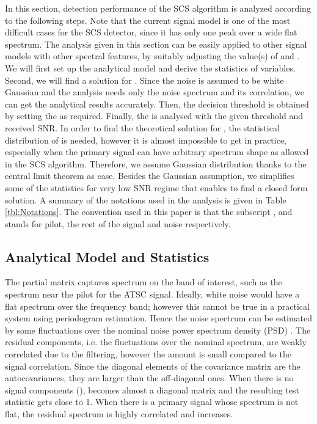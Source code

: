 \documentclass[draftclsnofoot,onecolumn,12pt]{IEEEtran}
\begin{document}
In this section, detection performance of the SCS algorithm is analyzed according to the following steps.
Note that the current signal model is one of the most difficult cases for the SCS detector, since it has only one peak over a wide flat spectrum. The analysis given in this section can be easily applied to other signal models with other spectral features, by suitably adjusting the value(s) of  and .
We will first set up the analytical model and derive the statistics of variables.
Second, we will find a solution for . Since the noise is assumed to be white Gaussian and the  analysis needs only the noise spectrum and its correlation, we can get the analytical results accurately.
Then, the decision threshold  is obtained by setting the  as required.
Finally, the  is analysed with the given threshold and received SNR.
In order to find the theoretical solution for , the statistical distribution of  is needed, however it is almost impossible to get in practice, especially when the primary signal can have arbitrary spectrum shape as allowed in the SCS algorithm. Therefore, we assume Gaussian distribution thanks to the central limit theorem as  case.
Besides the Gaussian assumption, we simplifies some of the statistics for very low SNR regime that enables to find a closed form solution.
A summary of the notations used in the analysis is given in Table \ref{tbl:Notations}.
The convention used in this paper is that the subscript ,  and  stands for pilot, the rest of the signal and noise respectively.



\subsection{Analytical Model and Statistics}
\label{subsec:stats}

The partial matrix  captures spectrum on the band of interest, such as the spectrum near the pilot for the ATSC signal.
Ideally, white noise would have a flat spectrum over the frequency band; however this cannot be true in a practical system using periodogram estimation.
Hence the noise spectrum can be estimated by some fluctuations over the nominal noise power spectrum density (PSD) . The residual components, i.e. the fluctuations over the nominal spectrum, are weakly correlated due to the filtering, however the amount is small compared to the signal correlation.
Since the diagonal elements of the covariance matrix  are the autocovariances, they are larger than the off-diagonal ones.
When there is no signal components (),  becomes almost a diagonal matrix and the resulting test statistic  gets close to 1.
When there is a primary signal whose spectrum is not flat, the residual spectrum is highly correlated and  increases.
\end{document}
